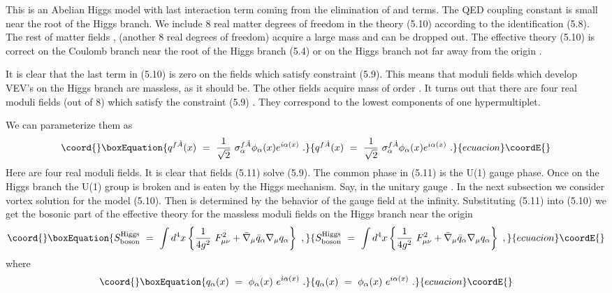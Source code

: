 \documentclass[a4paper,12pt]{article}
\begin{document}
This is an Abelian Higgs model with last interaction term coming
from the elimination of \coordHE{} and \coordHE{} terms. The QED coupling
constant \coordHE{} is small near the root of the Higgs branch.
 We include 8 real matter degrees of
freedom \coordHE{} in the theory (5.10) according to the
identification (5.8). The rest of matter fields \coordHE{}, \coordHE{} (another 8 real degrees of freedom) acquire a large mass
\coordHE{} and can be dropped out. The effective theory (5.10) is
correct on the Coulomb branch near the root of the Higgs branch
(5.4) or on the Higgs branch not far away from the origin
\coordHE{}.

It is clear that the last term in (5.10) is zero on the fields
\coordHE{} which satisfy constraint (5.9). This means that moduli
fields which develop VEV's on the Higgs branch are massless, as
it should be. The other fields acquire mass of order
\coordHE{}. It turns out that there are four
real moduli fields \coordHE{} (out of 8) which satisfy the constraint
(5.9) \cite{SW2}. They correspond to the lowest components of  one
hypermultiplet.

We can parameterize them as
\begin{equation}\coord{}\boxEquation{
q^{f\dot A}(x)\ =\ \frac1{\sqrt2}\ \sigma^{f\dot A}_\alpha
\phi_\alpha(x) e^{i\alpha(x)}\ .
}{
q^{f\dot A}(x)\ =\ \frac1{\sqrt2}\ \sigma^{f\dot A}_\alpha
\phi_\alpha(x) e^{i\alpha(x)}\ .
}{ecuacion}\coordE{}\end{equation}
Here \coordHE{} are four real moduli
fields. It is clear that fields (5.11) solve (5.9). The common
phase \coordHE{} in (5.11) is the U(1) gauge phase. Once
\coordHE{} on the Higgs branch the U(1)
group is broken and \coordHE{} is eaten by the Higgs  mechanism.
Say, in the unitary gauge \coordHE{}. In the next subsection
we consider vortex solution for the model (5.10). Then
\coordHE{} is determined by the behavior of the gauge field at
the infinity. Substituting (5.11) into (5.10) we get the bosonic
part of the effective theory
for the massless moduli fields  on the Higgs branch near the origin
\begin{equation}\coord{}\boxEquation{
S^{\rm Higgs}_{\rm boson}\ =\ \int d^4x\left\{\frac1{4g^2}\
F^2_{\mu\nu}+\bar\nabla_\mu\bar q_\alpha\nabla_\mu
q_\alpha\right\}\ ,
}{
S^{\rm Higgs}_{\rm boson}\ =\ \int d^4x\left\{\frac1{4g^2}\
F^2_{\mu\nu}+\bar\nabla_\mu\bar q_\alpha\nabla_\mu
q_\alpha\right\}\ ,
}{ecuacion}\coordE{}\end{equation}
where
\begin{equation}\coord{}\boxEquation{
q_\alpha(x)\ =\ \phi_\alpha(x)\ e^{i\alpha(x)}\ .
}{
q_\alpha(x)\ =\ \phi_\alpha(x)\ e^{i\alpha(x)}\ .
}{ecuacion}\coordE{}\end{equation}
\end{document}
